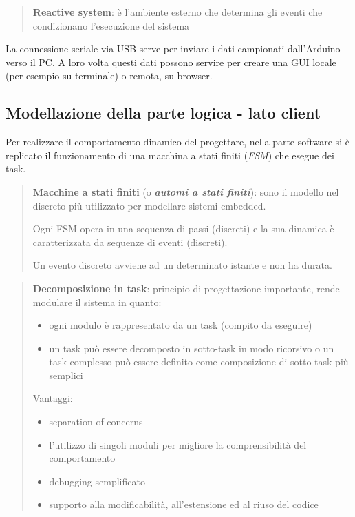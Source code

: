 	\begin{quote}
		\textbf{Reactive system}: è l’ambiente esterno che determina gli eventi che
		condizionano l’esecuzione del sistema
	\end{quote}
	
La connessione seriale via USB serve per inviare i dati campionati dall'Arduino verso il PC. A loro volta questi dati possono servire per creare una GUI locale (per esempio su terminale) o remota, su browser.

\subsection{Modellazione della parte logica - lato client}
Per realizzare il comportamento dinamico del progettare, nella parte software si è replicato il funzionamento di una macchina a stati finiti (\textit{FSM}) che esegue dei task.

	\begin{quote}
		\textbf{Macchine a stati finiti} (o \textbf{\textit{automi a stati finiti}}): sono il modello nel discreto più utilizzato per modellare sistemi embedded.
		
		Ogni FSM opera in una sequenza di passi (discreti) e la sua dinamica è caratterizzata da sequenze di eventi (discreti).
		
		Un evento discreto avviene ad un determinato istante e non ha durata.
	\end{quote}
	
	\begin{quote}
		\textbf{Decomposizione in task}: principio di progettazione importante, rende modulare il sistema in quanto:
		\begin{itemize}
			\item ogni modulo è rappresentato da un task (compito da eseguire)
			\item un task può essere decomposto in sotto-task in modo ricorsivo o un task complesso può essere definito come composizione di sotto-task più semplici
		\end{itemize}
		Vantaggi:
		\begin{itemize}
			\item separation of concerns
			\item l'utilizzo di singoli moduli per migliore la comprensibilità del comportamento
			\item debugging semplificato
			\item supporto alla modificabilità, all'estensione ed al riuso del codice
		\end{itemize}
	\end{quote}
	
